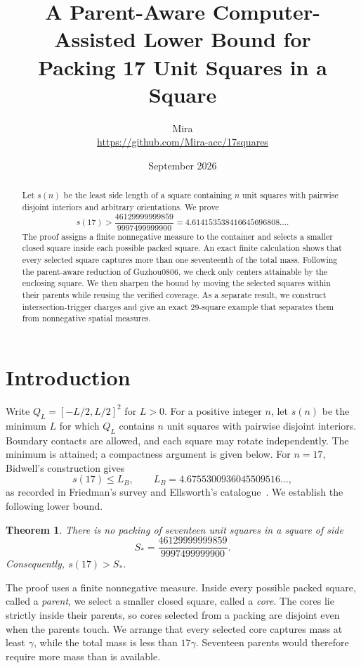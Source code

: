\documentclass[11pt]{article}
\title{A Parent-Aware Computer-Assisted Lower Bound for\\Packing 17 Unit Squares in a Square}
\author{Mira\\\small \url{https://github.com/Mira-acc/17squares}}
\date{September 2026}
\newtheorem{theorem}{Theorem}
\newcommand{\Q}{Q}
\begin{document}
\maketitle

\begin{abstract}
Let $s(n)$ be the least side length of a square containing $n$ unit squares
with pairwise disjoint interiors and arbitrary orientations. We prove
\[
  s(17)>\frac{46129999999859}{9997499999900}
  =4.614153538416645696808\ldots.
\]
The proof assigns a finite nonnegative measure to the container and selects a
smaller closed square inside each possible packed square. An exact finite
calculation shows that every selected square captures more than one seventeenth
of the total mass. Following the parent-aware reduction of Guzhou0806, we
check only centers attainable by the enclosing square. We then sharpen the
bound by moving the selected squares within their parents while reusing the
verified coverage. As a separate result, we construct intersection-trigger
charges and give an exact 29-square example that separates them from
nonnegative spatial measures.
\end{abstract}

\section{Introduction}

Write $\Q_L=[-L/2,L/2]^2$ for $L>0$. For a positive integer $n$, let $s(n)$
be the minimum $L$ for which $\Q_L$ contains $n$ unit squares with pairwise
disjoint interiors. Boundary contacts
are allowed, and each square may rotate independently. The minimum is attained;
a compactness argument is given below. For $n=17$, Bidwell's construction gives
\[
  s(17)\le L_B,\qquad L_B=4.6755300936045509516\ldots,
\]
as recorded in Friedman's survey and Ellsworth's
catalogue~\cite{Friedman2009,Ellsworth}. We establish the following lower bound.

\begin{theorem}\label{thm:main}
There is no packing of seventeen unit squares in a square of side
\[
  S_* = \frac{46129999999859}{9997499999900}.
\]
Consequently, $s(17)>S_*$.
\end{theorem}

The proof uses a finite nonnegative measure. Inside every possible packed
square, called a \emph{parent}, we select a smaller closed square, called a
\emph{core}. The cores lie strictly inside their parents, so cores selected
from a packing are disjoint even when the parents touch. We arrange that
every selected core captures mass at least $\gamma$, while the total mass is
less than $17\gamma$. Seventeen parents would therefore require more mass
than is available.
\end{document}
